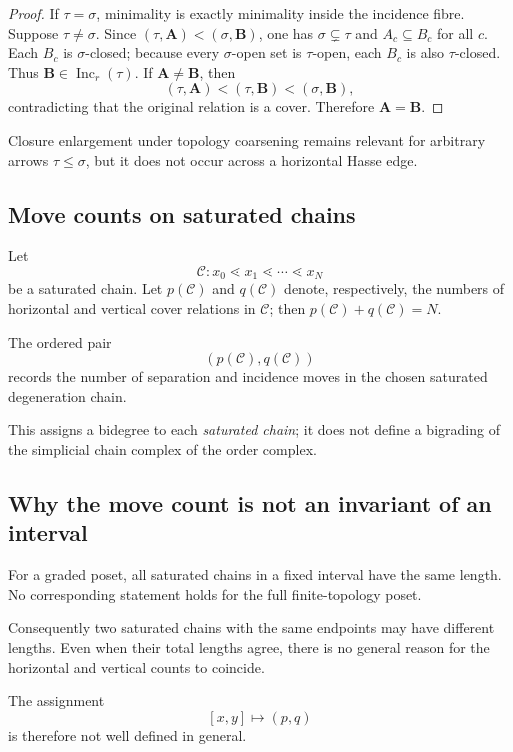 \documentclass[11pt]{article}
\theoremstyle{plain}
\theoremstyle{definition}
\begin{document}
\begin{proof}
If $\tau=\sigma$, minimality is exactly minimality inside the incidence fibre.  Suppose
$\tau\neq\sigma$.  Since
$(\tau,\mathbf A)<(\sigma,\mathbf B)$, one has $\sigma\subsetneq\tau$ and
$A_c\subseteq B_c$ for all $c$.  Each $B_c$ is $\sigma$-closed; because every
$\sigma$-open set is $\tau$-open, each $B_c$ is also $\tau$-closed.  Thus
$\mathbf B\in\operatorname{Inc}_r(\tau)$.  If $\mathbf A\neq\mathbf B$, then
\[
(\tau,\mathbf A)<(\tau,\mathbf B)<(\sigma,\mathbf B),
\]
contradicting that the original relation is a cover.  Therefore
$\mathbf A=\mathbf B$.
\end{proof}

Closure enlargement under topology coarsening remains relevant for arbitrary arrows
$\tau\leq\sigma$, but it does not occur across a horizontal Hasse edge.

\subsection{Move counts on saturated chains}
\label{subsec:move-counts}

Let
\[
\mathcal C:x_0\lessdot x_1\lessdot\cdots\lessdot x_N
\]
be a saturated chain.  Let $p(\mathcal C)$ and $q(\mathcal C)$ denote, respectively,
the numbers of horizontal and vertical cover relations in $\mathcal C$; then
$p(\mathcal C)+q(\mathcal C)=N$.

The ordered pair
\[
(p(\mathcal C),q(\mathcal C))
\]
records the number of separation and incidence moves in the chosen
saturated degeneration chain.

This assigns a bidegree to each \emph{saturated chain}; it does not define a bigrading of the simplicial chain complex of the order complex.


\subsection{Why the move count is not an invariant of an interval}
\label{subsec:move-count-not-invariant}

For a graded poset, all saturated chains in a fixed interval have the
same length.  No corresponding statement holds for the full
finite-topology poset.

Consequently two saturated chains with the same endpoints may have
different lengths.  Even when their total lengths agree, there is no
general reason for the horizontal and vertical counts to coincide.

The assignment
\[
[x,y]\longmapsto(p,q)
\]
is therefore not well defined in general.
\end{document}
